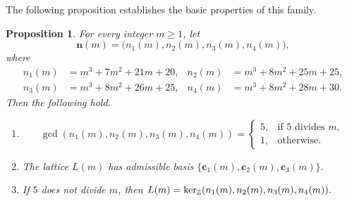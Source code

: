 \documentclass[12pt,a4paper]{amsart}
\newtheorem{proposition}[theorem]{Proposition}
\theoremstyle{definition}
\begin{document}
The following proposition establishes the basic properties of this
family.

\begin{proposition}\label{prop:family}
For every integer $m\ge1$, let
\[
\mathbf n(m)=
\bigl(n_1(m),n_2(m),n_3(m),n_4(m)\bigr),
\]
where
\[
\begin{aligned}
n_1(m)&=m^3+7m^2+21m+20, &
n_2(m)&=m^3+8m^2+25m+25,\\
n_3(m)&=m^3+8m^2+26m+25, &
n_4(m)&=m^3+8m^2+28m+30.
\end{aligned}
\]
Then the following hold.

\begin{enumerate}
\item[\textup{(i)}]
\[
\gcd(n_1(m),n_2(m),n_3(m),n_4(m))
=
\begin{cases}
5,&\text{if $5$ divides $m$,}\\
1,&\text{otherwise.}
\end{cases}
\]

\item[\textup{(ii)}]
The lattice $L(m)$ has admissible basis
$\{\mathbf c_1(m),\mathbf c_2(m),\mathbf c_3(m)\}$.

\item[\textup{(iii)}]
If $5$ does not divide $m$, then $
L(m)={\rm ker}_{\mathbb Z}(n_{1}(m),n_{2}(m),n_{3}(m),n_{4}(m)).$
\end{enumerate}
\end{proposition}
\end{document}
